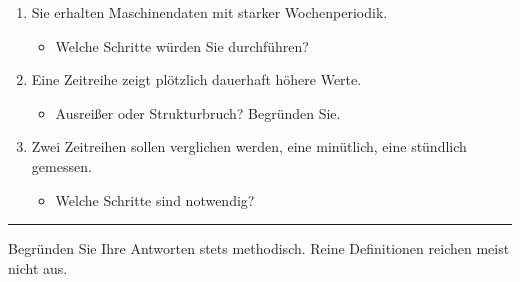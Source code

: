 \documentclass[
  ngerman,
  letterpaper,
  DIV=11]{scrreprt}
\providecommand{\tightlist}{%
  \setlength{\itemsep}{0pt}\setlength{\parskip}{0pt}}
\begin{document}
\begin{enumerate}
\def\labelenumi{\arabic{enumi}.}
\tightlist
\item
  Sie erhalten Maschinendaten mit starker Wochenperiodik.

  \begin{itemize}
  \tightlist
  \item
    Welche Schritte würden Sie durchführen?
  \end{itemize}
\item
  Eine Zeitreihe zeigt plötzlich dauerhaft höhere Werte.

  \begin{itemize}
  \tightlist
  \item
    Ausreißer oder Strukturbruch? Begründen Sie.
  \end{itemize}
\item
  Zwei Zeitreihen sollen verglichen werden, eine minütlich, eine
  stündlich gemessen.

  \begin{itemize}
  \tightlist
  \item
    Welche Schritte sind notwendig?
  \end{itemize}
\end{enumerate}

\begin{center}\rule{0.5\linewidth}{0.5pt}\end{center}

\begin{tcolorbox}[enhanced jigsaw, titlerule=0mm, title=\textcolor{quarto-callout-warning-color}{\faExclamationTriangle}\hspace{0.5em}{Hinweis zur Prüfungsvorbereitung}, bottomrule=.15mm, opacityback=0, colbacktitle=quarto-callout-warning-color!10!white, coltitle=black, opacitybacktitle=0.6, colframe=quarto-callout-warning-color-frame, toprule=.15mm, leftrule=.75mm, arc=.35mm, rightrule=.15mm, breakable, bottomtitle=1mm, colback=white, toptitle=1mm, left=2mm]

Begründen Sie Ihre Antworten stets methodisch. Reine Definitionen
reichen meist nicht aus.

\end{tcolorbox}
\end{document}
